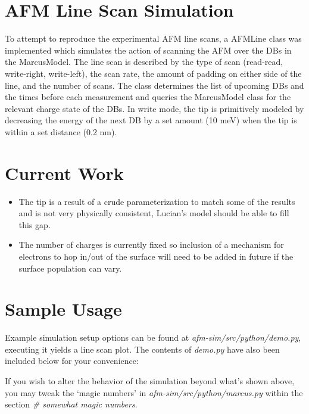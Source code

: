 \documentclass{article}
\begin{document}
\section{AFM Line Scan Simulation} \label{sec:simulation}

To attempt to reproduce the experimental AFM line scans, a AFMLine class was implemented which simulates the action of scanning the AFM over the DBs in the MarcusModel. The line scan is described by the type of scan (read-read, write-right, write-left), the scan rate, the amount of padding on either side of the line, and the number of scans. The class determines the list of upcoming DBs and the times before each measurement and queries the MarcusModel class for the relevant charge state of the DBs. In write mode, the tip is primitively modeled by decreasing the energy of the next DB by a set amount (10 meV) when the tip is within a set distance (0.2 nm).

\section{Current Work}

\begin{itemize}
 \item The tip is a result of a crude parameterization to match some of the results and is not very physically consistent, Lucian's model should be able to fill this gap.
 \item The number of charges is currently fixed so inclusion of a mechanism for electrons to hop in/out of the surface will need to be added in future if the surface population can vary.
\end{itemize}


\clearpage
\section{Sample Usage}

Example simulation setup options can be found at \textit{afm-sim/src/python/demo.py}, executing it yields a line scan plot. The contents of \textit{demo.py} have also been included below for your convenience:



If you wish to alter the behavior of the simulation beyond what's shown above, you may tweak the `magic numbers' in \textit{afm-sim/src/python/marcus.py} within the section \textit{\# somewhat magic numbers}.
\end{document}
